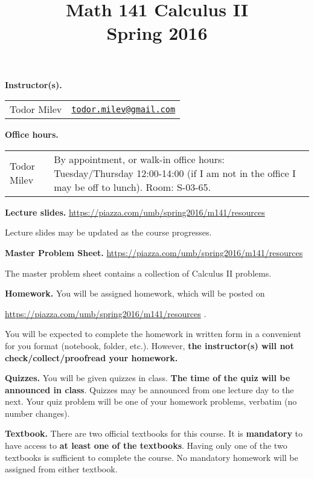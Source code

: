 \documentclass{article}
\title{Math 141 Calculus II \\ Spring 2016}
\date{}
\newcommand{\websitebase}{https://piazza.com/umb/spring2016/m141}
\begin{document}
\maketitle

\noindent \textbf{Instructor(s).} 
\begin{tabular}{ll}
Todor Milev & \href{mailto:todor.milev@gmail.com}{\nolinkurl{todor.milev@gmail.com}} 
\end{tabular}

\medskip
\noindent \textbf{Office hours. } \begin{tabular}{lp{12cm}}
Todor Milev & By appointment, or walk-in office hours: Tuesday/Thursday 12:00-14:00 (if I am not in the office I may be off to lunch).  Room: S-03-65.\\
\end{tabular}





\medskip \noindent \textbf{Lecture slides. }  \url{\websitebase/resources}

\medskip\noindent Lecture slides may be updated as the course progresses.


\medskip \noindent \textbf{Master Problem Sheet. }  \url{\websitebase/resources} 

\medskip\noindent The master problem sheet contains a collection of Calculus II problems. 

\medskip
\noindent \textbf{Homework.} You will be assigned homework, which will be posted on

\url{\websitebase/resources} \quad \quad \quad .

\noindent You will be expected to complete the homework in written form in a convenient for you format (notebook, folder, etc.). However, \textbf{the instructor(s) will not check/collect/proofread your homework.} 
 
\medskip
\noindent \textbf{Quizzes.} You will be given quizzes in class. \textbf{The time of the quiz will be announced in class}. Quizzes may be announced from one lecture day to the next. Your quiz problem will be one of your homework problems, verbatim (no number changes).

\medskip\noindent \textbf{Textbook. } There are two official textbooks for this course. It is  \textbf{mandatory} to have access to \textbf{at least one of the textbooks}. Having only one of the two textbooks is sufficient to complete the course. No mandatory homework will be assigned from either textbook. 
\end{document}
